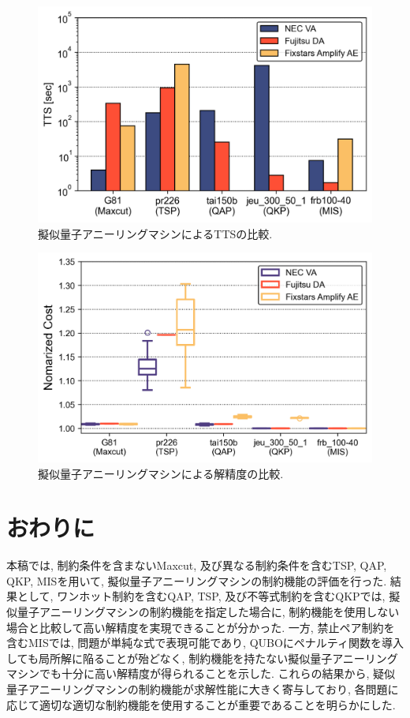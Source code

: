 \documentclass[submit,techrep,noauthor]{ipsj}
\begin{document}
\begin{figure}[tb]
\centering
\includegraphics[bb=0 0 700 230, width=15cm]{TTS_All.png}
\caption{擬似量子アニーリングマシンによるTTSの比較.}
\label{TTS_All}
\end{figure}

\begin{figure}[tb]
\centering
\includegraphics[bb=0 0 700 230, width=15cm]{Cost_All.png}
\caption{擬似量子アニーリングマシンによる解精度の比較.}
\label{Cost_All}
\end{figure}

\section{おわりに}
本稿では, 制約条件を含まないMaxcut, 及び異なる制約条件を含むTSP, QAP, QKP, MISを用いて, 擬似量子アニーリングマシンの制約機能の評価を行った. 結果として, ワンホット制約を含むQAP, TSP, 及び不等式制約を含むQKPでは, 擬似量子アニーリングマシンの制約機能を指定した場合に, 制約機能を使用しない場合と比較して高い解精度を実現できることが分かった. 一方, 禁止ペア制約を含むMISでは, 問題が単純な式で表現可能であり, QUBOにペナルティ関数を導入しても局所解に陥ることが殆どなく, 制約機能を持たない擬似量子アニーリングマシンでも十分に高い解精度が得られることを示した. これらの結果から, 疑似量子アニーリングマシンの制約機能が求解性能に大きく寄与しており, 各問題に応じて適切な適切な制約機能を使用することが重要であることを明らかにした.
\end{document}
